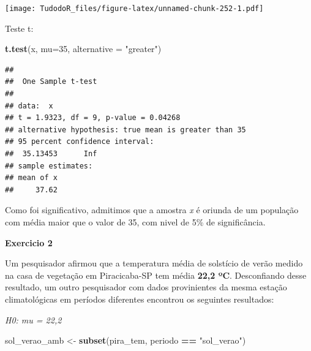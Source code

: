\documentclass[
]{book}
\newenvironment{Shaded}{\begin{snugshade}}{\end{snugshade}}
\newcommand{\DataTypeTok}[1]{\textcolor[rgb]{0.13,0.29,0.53}{#1}}
\newcommand{\DecValTok}[1]{\textcolor[rgb]{0.00,0.00,0.81}{#1}}
\newcommand{\KeywordTok}[1]{\textcolor[rgb]{0.13,0.29,0.53}{\textbf{#1}}}
\newcommand{\NormalTok}[1]{#1}
\newcommand{\OperatorTok}[1]{\textcolor[rgb]{0.81,0.36,0.00}{\textbf{#1}}}
\newcommand{\StringTok}[1]{\textcolor[rgb]{0.31,0.60,0.02}{#1}}
\begin{document}
\texttt{[image: TudodoR\_files/figure-latex/unnamed-chunk-252-1.pdf]}

Teste t:

\begin{Shaded}
\begin{Highlighting}[]
\KeywordTok{t.test}\NormalTok{(x,}
       \DataTypeTok{mu=}\DecValTok{35}\NormalTok{,}
       \DataTypeTok{alternative =} \StringTok{"greater"}\NormalTok{)}
\end{Highlighting}
\end{Shaded}

\begin{verbatim}
## 
##  One Sample t-test
## 
## data:  x
## t = 1.9323, df = 9, p-value = 0.04268
## alternative hypothesis: true mean is greater than 35
## 95 percent confidence interval:
##  35.13453      Inf
## sample estimates:
## mean of x 
##     37.62
\end{verbatim}

Como foi significativo, admitimos que a amostra \emph{x} é oriunda de um população com média maior que o valor de 35, com nivel de 5\% de significância.

\textbf{Exercicio 2}

Um pesquisador afirmou que a temperatura média de solstício de verão medido na casa de vegetação em Piracicaba-SP tem média \textbf{22,2 ºC}.
Desconfiando desse resultado, um outro pesquisador com dados provinientes da mesma estação climatológicas em períodos diferentes encontrou os seguintes resultados:

\emph{H0: mu = 22,2}

\begin{Shaded}
\begin{Highlighting}[]
\NormalTok{  sol_verao_amb <-}\StringTok{ }\KeywordTok{subset}\NormalTok{(pira_tem, periodo }\OperatorTok{==}\StringTok{ "sol_verao"}\NormalTok{)}
\end{Highlighting}
\end{Shaded}

\begin{Shaded}
\end{Shaded}
\end{document}
